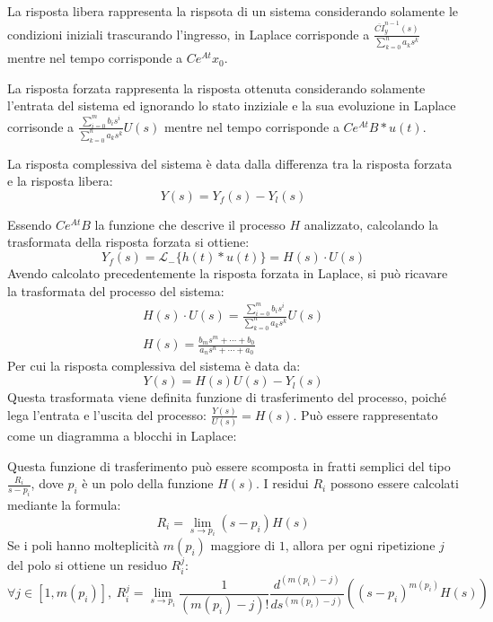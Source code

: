 \documentclass{article}
\numberwithin{equation}{subsection}
\begin{document}
La risposta libera rappresenta la rispsota di un sistema considerando solamente le condizioni iniziali trascurando l'ingresso, in Laplace corrisponde a 
$\displaystyle\frac{\overline{CI}_y^{n-1}(s)}{\sum_{k=0}^{n}a_ks^k}$ mentre nel tempo corrisponde a $Ce^{At}x_0$. 


La risposta forzata rappresenta la risposta ottenuta considerando solamente l'entrata del sistema ed ignorando lo stato inziziale e la sua evoluzione in Laplace corrisonde a 
$\displaystyle\frac{\sum_{i=0}^{m}b_is^i}{\sum_{k=0}^{n}a_ks^k}U(s)$ mentre nel tempo corrisponde a $Ce^{At}B*u(t)$.


La risposta complessiva del sistema è data dalla differenza tra la risposta forzata e la risposta libera: 
\begin{equation}
    Y(s)=Y_f(s)-Y_l(s)
\end{equation}

Essendo $Ce^{At}B$ la funzione che descrive il processo $H$ analizzato, calcolando la trasformata della risposta forzata si ottiene:
\begin{equation}
    Y_f(s)=\mathscr{L}_-\{h(t)*u(t)\}=H(s)\cdot U(s)
\end{equation}
Avendo calcolato precedentemente la risposta forzata in Laplace, si può ricavare la trasformata del processo del sistema:
\begin{gather}
    H(s)\cdot U(s)=\displaystyle\frac{\sum_{i=0}^{m}b_is^i}{\sum_{k=0}^{n}a_ks^k}U(s)\\
    H(s)=\displaystyle\frac{b_ms^m+\cdots+b_0}{a_ns^n+\cdots+a_0}
\end{gather}
Per cui la risposta complessiva del sistema è data da:
\begin{equation}
    Y(s)=H(s)U(s)-Y_l(s)
\end{equation}
Questa trasformata viene definita funzione di trasferimento del processo, poiché lega l'entrata e l'uscita del processo: $\displaystyle\frac{Y(s)}{U(s)}=H(s)$. Può essere 
rappresentato come un diagramma a blocchi in Laplace:
\begin{center}
\end{center}

Questa funzione di trasferimento può essere scomposta in fratti semplici del tipo $\displaystyle\frac{R_i}{s-p_i}$, dove $p_i$ è un polo della funzione $H(s)$. I residui $R_i$ 
possono essere calcolati mediante la formula: 
\begin{equation}
    R_i=\lim_{s\to p_i}(s-p_i)H(s)
\end{equation}
Se i poli hanno molteplicità $m(p_i)$ maggiore di $1$, allora per ogni ripetizione $j$ del polo si ottiene un residuo $R_i^j$:
\begin{equation}
    \forall j\in[1,m(p_i)],\:R_i^j=\lim_{s\to p_i}\displaystyle\frac{1}{(m(p_i)-j)!}\frac{d^{(m(p_i)-j)}}{ds^{(m(p_i)-j)}}\left((s-p_i)^{m(p_i)}H(s)\right)
\end{equation}
\end{document}
